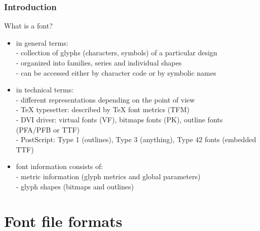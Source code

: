 \documentclass{beamer}
\begin{document}
\begin{frame}[fragile]
\frametitle{Introduction}
What is a font?
\begin{itemize}
\item in general terms:\\
      \footnotesize{- collection of glyphs (characters, symbols) of a particular design\\
      - organized into families, series and individual shapes\\
      - can be accessed either by character code or by symbolic names}
\item \normalsize{in technical terms:}\\
      \footnotesize{- different representations depending on the point of view\\
      - \TeX{} typesetter: described by \TeX{} font metrics (TFM)\\
      - DVI driver: virtual fonts (VF), bitmaps fonts (PK), outline fonts (PFA/PFB or TTF)\\
      - PostScript: Type 1 (outlines), Type 3 (anything), Type 42 fonts (embedded TTF)}
\item \normalsize{font information consists of:}\\
      \footnotesize{- metric information (glyph metrics and global parameters)\\
      - glyph shapes (bitmaps and outlines)}
\end{itemize}
\end{frame}

\section{Font file formats}
\end{document}
